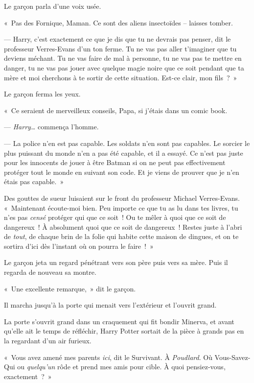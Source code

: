 Le garçon parla d'une voix usée.

«~Pas des Fornique, Maman.
Ce sont des aliens insectoïdes -- laisses tomber.

--- Harry, c'est exactement ce que je dis que tu ne devrais pas penser, dit le professeur Verres-Evans d'un ton ferme.
Tu ne vas pas aller t'imaginer que tu deviens méchant.
Tu ne vas faire de mal à personne, tu ne vas pas te mettre en danger, tu ne vas pas jouer avec quelque magie noire que ce soit pendant que ta mère et moi cherchons à te sortir de cette situation.
Est-ce clair, mon fils~?~»

Le garçon ferma les yeux.

«~Ce seraient de merveilleux conseils, Papa, si j'étais dans un comic book.

--- \emph{Harry…} commença l'homme.

--- La police n'en est pas capable.
Les soldats n'en sont pas capables.
Le sorcier le plus puissant du monde n'en a pas été capable, et il a essayé.
Ce n'est pas juste pour les innocents de jouer à être Batman si on ne peut pas effectivement protéger tout le monde en suivant son code.
Et je viens de prouver que je n'en étais pas capable.~»

Des gouttes de sueur luisaient sur le front du professeur Michael Verres-Evans.
«~Maintenant écoute-moi bien.
Peu importe ce que tu as lu dans tes livres, tu n'es pas \emph{censé} protéger qui que ce soit~!
Ou te mêler à quoi que ce soit de dangereux~!
À absolument quoi que ce soit de dangereux~!
Restes juste à l'abri de \emph{tout}, de chaque brin de la folie qui habite cette maison de dingues, et on te sortira d'ici dès l'instant où on pourra le faire~!~»

Le garçon jeta un regard pénétrant vers son père puis vers sa mère.
Puis il regarda de nouveau sa montre.

«~Une excellente remarque,~» dit le garçon.

Il marcha jusqu'à la porte qui menait vers l'extérieur et l'ouvrit grand.

\later

La porte s'ouvrit grand dans un craquement qui fit bondir Minerva, et avant qu'elle ait le temps de réfléchir, Harry Potter sortait de la pièce à grands pas en la regardant d'un air furieux.

«~Vous avez amené mes parents \emph{ici}, dit le Survivant.
À \emph{Poudlard}.
Où Vous-Savez-Qui ou \emph{quelqu'un} rôde et prend mes amis pour cible.
À quoi pensiez-vous, exactement~?~»

